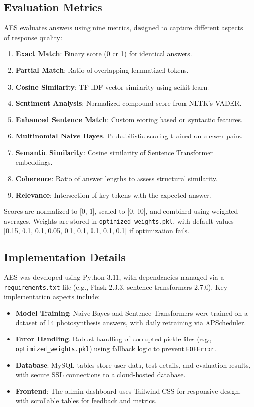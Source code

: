 \documentclass[conference]{IEEEtran}
\begin{document}
\subsection{Evaluation Metrics}
AES evaluates answers using nine metrics, designed to capture different aspects of response quality:
\begin{enumerate}
    \item \textbf{Exact Match}: Binary score (0 or 1) for identical answers.
    \item \textbf{Partial Match}: Ratio of overlapping lemmatized tokens.
    \item \textbf{Cosine Similarity}: TF-IDF vector similarity using scikit-learn.
    \item \textbf{Sentiment Analysis}: Normalized compound score from NLTK's VADER.
    \item \textbf{Enhanced Sentence Match}: Custom scoring based on syntactic features.
    \item \textbf{Multinomial Naive Bayes}: Probabilistic scoring trained on answer pairs.
    \item \textbf{Semantic Similarity}: Cosine similarity of Sentence Transformer embeddings.
    \item \textbf{Coherence}: Ratio of answer lengths to assess structural similarity.
    \item \textbf{Relevance}: Intersection of key tokens with the expected answer.
\end{enumerate}

Scores are normalized to [0, 1], scaled to [0, 10], and combined using weighted averages. Weights are stored in \texttt{optimized\_weights.pkl}, with default values [0.15, 0.1, 0.1, 0.05, 0.1, 0.1, 0.1, 0.1, 0.1] if optimization fails.

\subsection{Implementation Details}
AES was developed using Python 3.11, with dependencies managed via a \texttt{requirements.txt} file (e.g., Flask 2.3.3, sentence-transformers 2.7.0). Key implementation aspects include:
\begin{itemize}
    \item \textbf{Model Training}: Naive Bayes and Sentence Transformers were trained on a dataset of 14 photosynthesis answers, with daily retraining via APScheduler.
    \item \textbf{Error Handling}: Robust handling of corrupted pickle files (e.g., \texttt{optimized\_weights.pkl}) using fallback logic to prevent \texttt{EOFError}.
    \item \textbf{Database}: MySQL tables store user data, test details, and evaluation results, with secure SSL connections to a cloud-hosted database.
    \item \textbf{Frontend}: The admin dashboard uses Tailwind CSS for responsive design, with scrollable tables for feedback and metrics.
\end{itemize}
\end{document}
